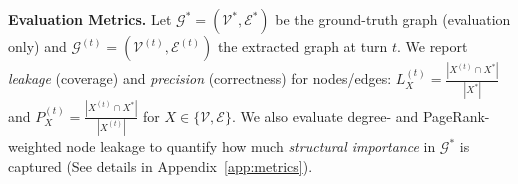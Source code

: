 \noindent\textbf{Evaluation Metrics.}
Let $\mathcal{G}^*=(\mathcal{V}^*,\mathcal{E}^*)$ be the ground-truth graph (evaluation only) and
$\mathcal{G}^{(t)}=(\mathcal{V}^{(t)},\mathcal{E}^{(t)})$ the extracted graph at turn $t$.
We report \emph{leakage} (coverage) and \emph{precision} (correctness) for nodes/edges:
$L_X^{(t)}=\frac{|X^{(t)}\cap X^*|}{|X^*|}$ and
$P_X^{(t)}=\frac{|X^{(t)}\cap X^*|}{|X^{(t)}|}$ for $X\in\{\mathcal{V},\mathcal{E}\}$.
We also evaluate degree- and PageRank-weighted node leakage to quantify how much \emph{structural importance} in $\mathcal{G}^*$ is captured ({See details in} Appendix~\ref{app:metrics}).





